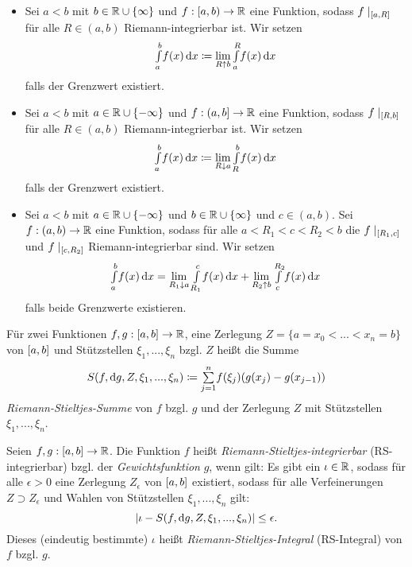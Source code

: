 \documentclass{cheat-sheet}
\begin{document}
\begin{defn}
  \begin{itemize}
    \item Sei $a < b$ mit $b \in \mathbb{R} \cup \{ \infty \}$ und $f : \left[ a, b \right) \to \mathbb{R}$ eine Funktion, sodass $f\mid_{\left[ a, R \right]}$ für alle $R \in (a, b)$ Riemann-integrierbar ist. Wir setzen
    \[ {\textstyle \int\limits_{a}^{b}} f(x) \,\mathrm{d} x \coloneqq \lim_{R \uparrow b} {\textstyle \int\limits_{a}^{R}} f(x) \,\mathrm{d} x \]
    falls der Grenzwert existiert.
    \item Sei $a < b$ mit $a \in \mathbb{R} \cup \{ -\infty \}$ und $f : \left( a, b \right] \to \mathbb{R}$ eine Funktion, sodass $f\mid_{\left[ R, b \right]}$ für alle $R \in (a, b)$ Riemann-integrierbar ist. Wir setzen
    \[ {\textstyle \int\limits_{a}^{b}} f(x) \,\mathrm{d} x \coloneqq \lim_{R \downarrow a} {\textstyle \int\limits_{R}^{b}} f(x) \,\mathrm{d} x \]
    falls der Grenzwert existiert.
    \item Sei $a < b$ mit $a \in \mathbb{R} \cup \{ -\infty \}$ und $b \in \mathbb{R} \cup \{ \infty \}$ und $c \in (a, b)$. Sei $f : (a, b) \to \mathbb{R}$ eine Funktion, sodass für alle $a < R_1 < c < R_2 < b$ die $f\mid_{\left[ R_1, c \right]}$ und $f\mid_{\left[ c, R_2 \right]}$ Riemann-integrierbar sind. Wir setzen
    \[ {\textstyle \int\limits_{a}^{b}} f(x) \,\mathrm{d} x = \lim_{R_1 \downarrow a} {\textstyle \int\limits_{R_1}^{c}} f(x) \,\mathrm{d} x + \lim_{R_2 \uparrow b} {\textstyle \int\limits_{c}^{R_2}} f(x) \,\mathrm{d} x \]
    falls beide Grenzwerte existieren.
  \end{itemize}
\end{defn}


\begin{defn}
  Für zwei Funktionen $f, g : \left[ a, b \right] \to \mathbb{R}$, eine Zerlegung $Z = \{ a = x_0 < ... < x_n = b \}$ von $\left[ a, b \right]$ und Stützstellen $\xi_1, ..., \xi_n$ bzgl. $Z$ heißt die Summe
  \[ S(f, \d g, Z, \xi_1, ..., \xi_n) \coloneqq \sum_{j=1}^{n}\!f(\xi_j)(g(x_j) - g(x_{j{-}1})) \]
  \emph{Riemann-Stieltjes-Summe} von $f$ bzgl. $g$ und der Zerlegung $Z$ mit Stützstellen $\xi_1, ..., \xi_n$.
\end{defn}

\begin{defn}
  Seien $f, g : \left[ a, b \right] \to \mathbb{R}$. Die Funktion $f$ heißt \emph{Riemann-Stieltjes-integrierbar} (RS-integrierbar) bzgl. der \emph{Gewichtsfunktion} $g$, wenn gilt: Es gibt ein $\iota \in \mathbb{R}$, sodass für alle $\epsilon > 0$ eine Zerlegung $Z_{\epsilon}$ von $\left[ a, b \right]$ existiert, sodass für alle Verfeinerungen $Z \supset Z_{\epsilon}$ und Wahlen von Stützstellen $\xi_1, ..., \xi_n$ gilt:
  \[ \lvert\iota - S(f, \mathrm{d} g, Z, \xi_1, ..., \xi_n)\rvert \le \epsilon. \]
  Dieses (eindeutig bestimmte) $\iota$ heißt \emph{Riemann-Stieltjes-Integral} (RS-Integral) von $f$ bzgl. $g$.
\end{defn}
\end{document}
